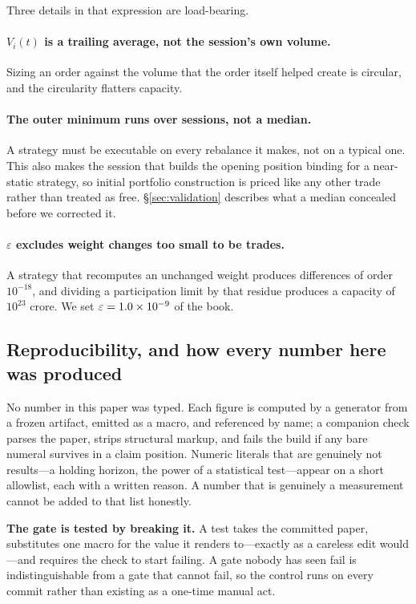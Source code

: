 \documentclass[11pt,a4paper]{article}
\begin{document}
Three details in that expression are load-bearing.

\paragraph{$V_i(t)$ is a trailing average, not the session's own volume.} Sizing an order against
the volume that the order itself helped create is circular, and the circularity flatters capacity.

\paragraph{The outer minimum runs over sessions, not a median.} A strategy must be executable on
every rebalance it makes, not on a typical one. This also makes the session that builds the opening
position binding for a near-static strategy, so initial portfolio construction is priced like any
other trade rather than treated as free. \S\ref{sec:validation} describes what a median
concealed before we corrected it.

\paragraph{$\varepsilon$ excludes weight changes too small to be trades.} A strategy that recomputes
an unchanged weight produces differences of order $10^{-18}$, and dividing a participation limit by
that residue produces a capacity of $10^{23}$ crore. We set $\varepsilon = 1.0\times10^{-9}$ of
the book.

\subsection{Reproducibility, and how every number here was produced}

No number in this paper was typed. Each figure is computed by a generator from a frozen artifact,
emitted as a macro, and referenced by name; a companion check parses the paper, strips structural
markup, and fails the build if any bare numeral survives in a claim position. Numeric literals that
are genuinely not results---a holding horizon, the power of a statistical test---appear on a short
allowlist, each with a written reason. A number that is genuinely a measurement cannot be added to
that list honestly.

\textbf{The gate is tested by breaking it.} A test takes the committed paper, substitutes one macro
for the value it renders to---exactly as a careless edit would---and requires the check to start
failing. A gate nobody has seen fail is indistinguishable from a gate that cannot fail, so the
control runs on every commit rather than existing as a one-time manual act.
\end{document}
